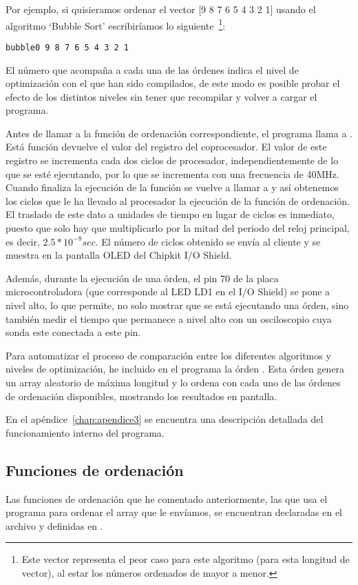 Por ejemplo, si quisieramos ordenar el vector [9 8 7 6 5 4 3 2 1] usando el algoritmo `Bubble Sort' escribiríamos lo siguiente~\footnote{Este vector representa el peor caso para este algoritmo (para esta longitud de vector), al estar los números ordenados de mayor a menor.}:
\begin{lstlisting}
bubble0 9 8 7 6 5 4 3 2 1
\end{lstlisting}

El número que acompaña a cada una de las órdenes indica el nivel de optimización con el que han sido compilados, de este modo es posible probar el efecto de los distintos niveles sin tener que recompilar y volver a cargar el programa. 

Antes de llamar a la función de ordenación correspondiente, el programa llama a . Está función devuelve el valor del registro  del coprocesador. El valor de este registro se incrementa cada dos ciclos de procesador, independientemente de lo que se esté ejecutando, por lo que se incrementa con una frecuencia de 40MHz. Cuando finaliza la ejecución de la función se vuelve a llamar a  y así obtenemos los ciclos que le ha llevado al procesador la ejecución de la función de ordenación. El traslado de este dato a unidades de tiempo en lugar de ciclos es inmediato, puesto que solo hay que multiplicarlo por la mitad del periodo del reloj principal, es decir, \(2.5*10^{-8}sec\).
El número de ciclos obtenido se envía al cliente y se muestra en la pantalla OLED del Chipkit I/O Shield.

Además, durante la ejecución de una órden, el pin 70 de la placa microcontroladora (que corresponde al LED LD1 en el I/O Shield) se pone a nivel alto, lo que permite, no solo mostrar que se está ejecutando una órden, sino también medir el tiempo que permanece a nivel alto con un osciloscopio cuya sonda este conectada a este pin. 

Para automatizar el proceso de comparación entre los diferentes algoritmos y niveles de optimización, he incluido en el programa la órden . Esta órden genera un array aleatorio de máxima longitud y lo ordena con cada uno de las órdenes de ordenación disponibles, mostrando los resultados en pantalla.

En el apéndice~\ref{chap:apendice3} se encuentra una descripción detallada del funcionamiento interno del programa.

\subsection{Funciones de ordenación}
Las funciones de ordenación que he comentado anteriormente, las que usa el programa para ordenar el array que le envíamos, se encuentran declaradas en el archivo  y definidas en .

